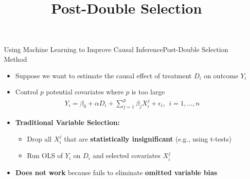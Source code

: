 \documentclass[dvipsnames,hyperref={pdfpagelabels=false}]{beamer}
\begin{document}
\title[]  
{Post-Double Selection}


\author 
{}

\institute{}






\date
{}


\begin{frame}{}
	\titlepage
\end{frame}



	



\begin{frame}{Using Machine Learning to Improve Causal Inference}{Post-Double Selection Method}
    \begin{itemize}
        \item Suppose we want to estimate the causal effect of treatment $D_{i}$ on outcome $Y_{i}$
        \vspace{0.2cm}
        \item Control $p$ potential covariates where $p$ is too large
        \vspace{0.2cm}
        \begin{eqnarray*}
            Y_{i} = \beta_{0} + \alpha D_{i} + \sum^{p}_{j=1} \beta_{j} X^{j}_{i}  + \epsilon_{i}, \ \ i=1, \ldots ,n
        \end{eqnarray*}		
        
        \item \textbf{Traditional Variable Selection:}
        \begin{itemize}
            \vspace{0.2cm}
            \item[1] Drop all $X^{j}_{i}$ that are \textbf{statistically insignificant} (e.g., using t-tests)
            \vspace{0.2cm}
            \item[2] Run OLS of $Y_{i}$ on $D_{i}$ and selected covariates $X^{j}_{i}$
        \end{itemize}
                    \vspace{0.2cm}
        \item \textbf{Does not work} because fails to eliminate \textbf{omitted variable bias}
    \end{itemize}
\end{frame}
\end{document}
